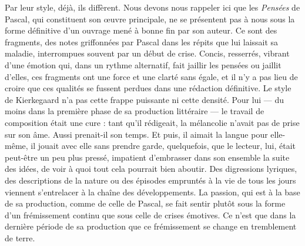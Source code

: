 \documentclass[12pt,a4paper]{article}
\newcommand{\opage}[1]{\marginnote{\footnotesize\textit{[#1]}}}
\begin{document}
Par leur style, déjà, ils diffèrent. Nous devons nous rappeler ici
que les \emph{Pensées} de Pascal, qui constituent son œuvre principale,
ne se présentent pas à nous sous la forme définitive d'un ouvrage
\opage{223} mené à bonne fin par son auteur. Ce sont des fragments, des notes
griffonnées par Pascal dans les répits que lui laissait sa maladie,
interrompues souvent par un début de crise. Concis, resserrés,
vibrant d'une émotion qui, dans un rythme alternatif, fait jaillir les
pensées ou jaillit d'elles, ces fragments ont une force et une clarté
sans égale, et il n'y a pas lieu de croire que ces qualités se fussent
perdues dans une rédaction définitive. Le style de Kierkegaard n'a
pas cette frappe puissante ni cette densité. Pour lui --- du moins
dans la première phase de sa production littéraire --- le travail de
composition était une cure : tant qu'il rédigeait, la mélancolie
n'avait pas de prise sur son âme. Aussi prenait-il son temps. Et
puis, il aimait la langue pour elle-même, il jouait avec elle sans
prendre garde, quelquefois, que le lecteur, lui, était peut-être un
peu plus pressé, impatient d'embrasser dans son ensemble la suite
des idées, de voir à quoi tout cela pourrait bien aboutir. Des digressions
lyriques, des descriptions de la nature ou des épisodes empruntés
à la vie de tous les jours viennent s'entrelacer à la chaîne des
développements. La passion, qui est à la base de sa production,
comme de celle de Pascal, se fait sentir plutôt sous la forme d'un
frémissement continu que sous celle de crises émotives. Ce n'est
que dans la dernière période de sa production que ce frémissement
se change en tremblement de terre.
\end{document}
